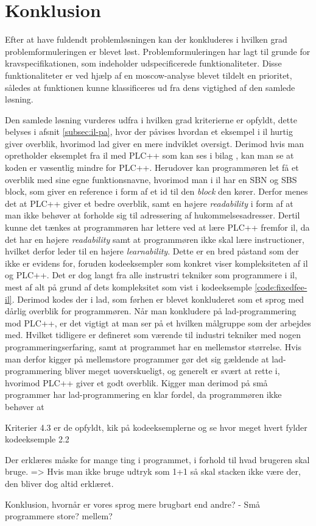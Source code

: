 \chapter{Konklusion}
\label{sec:konklusion}

Efter at have fuldendt problemløsningen kan der konkluderes i hvilken grad problemformuleringen er blevet løst.
Problemformuleringen har lagt til grunde for kravspecifikationen, som indeholder udspecificerede funktionaliteter.
Disse funktionaliteter er ved hjælp af en \gls{moscow}-analyse blevet tildelt en prioritet, således at funktionen kunne klassificeres ud fra dens vigtighed af den samlede løsning.

Den samlede løsning vurderes udfra i hvilken grad kriterierne er opfyldt, dette belyses i afsnit \ref{subsec:il-pa}, hvor der påvises hvordan et eksempel i \gls{il} hurtig giver overblik, hvorimod \gls{lad} giver en mere indviklet oversigt. Derimod hvis man opretholder eksemplet fra \gls{il} med PLC++ som kan ses i bilag \label{bil:semantik}, kan man se at koden er væsentlig mindre for PLC++.
Herudover kan programmøren let få et overblik med sine egne funktionsnavne, hvorimod man i \gls{il} har en SBN og SBS block, som giver en reference i form af et id til den \textit{block} den kører.
Derfor menes det at PLC++ giver et bedre overblik, samt en højere \textit{readability} i form af at man ikke behøver at forholde sig til adressering af hukommelsesadresser.
Dertil kunne det tænkes at programmøren har lettere ved at lære PLC++ fremfor \gls{il}, da det har en højere  \textit{readability} samt at programmøren ikke skal lære instructioner, hvilket derfor leder til en højere \textit{learnability}. Dette er en bred påstand som der ikke er evidens for, foruden kodeeksempler som konkret viser kompleksiteten af \gls{il} og PLC++.
Det er dog langt fra alle instrustri tekniker som programmere i \gls{il}, mest af alt på grund af dets kompleksitet som vist i kodeeksemple \ref{code:fixedfee-il}.
Derimod kodes der i \gls{lad}, som førhen er blevet konkluderet som et sprog med dårlig overblik for programmøren.
Når man konkludere på \gls{lad}-programmering mod PLC++, er det vigtigt at man ser på et hvilken målgruppe som der arbejdes med.
Hvilket tidligere er defineret som værende til industri tekniker med nogen programmeringserfaring, samt at programmet har en mellemstor størrelse.
Hvis man derfor kigger på mellemstore programmer gør det sig gældende at \gls{lad}-programmering bliver meget uoverskueligt, og generelt er svært at rette i, hvorimod PLC++ giver et godt overblik.
Kigger man derimod på små programmer har \gls{lad}-programmering en klar fordel, da programmøren ikke behøver at 






Kriterier 4.3 er de opfyldt, kik på kodeeksemplerne og se hvor meget hvert fylder kodeeksemple 2.2

Der erklæres måske for mange ting i programmet, i forhold til hvad brugeren skal bruge. => Hvis man ikke bruge udtryk som 1+1 så skal stacken ikke være der, den bliver dog altid erklæret.

Konklusion, hvornår er vores sprog mere brugbart end andre? - Små programmere store? mellem?

